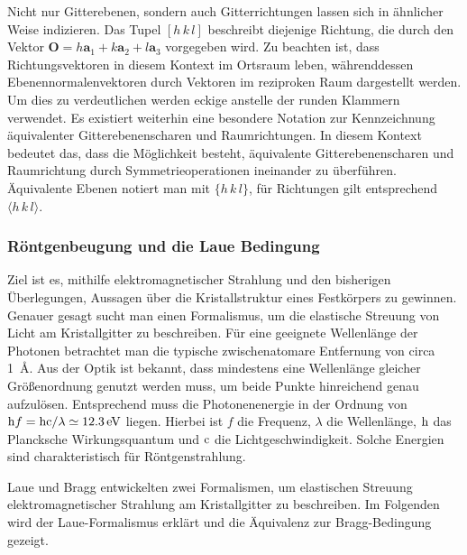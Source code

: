 Nicht nur Gitterebenen, sondern auch Gitterrichtungen lassen sich in ähnlicher Weise indizieren.
Das Tupel $[h\,k\,l]$ beschreibt diejenige Richtung, die durch den Vektor $\mathbf{O} = h\mathbf{a}_{1}+k\mathbf{a}_{2}+
l\mathbf{a}_{3}$ vorgegeben wird.
Zu beachten ist, dass Richtungsvektoren in diesem Kontext im Ortsraum leben,
währenddessen Ebenennormalenvektoren durch Vektoren im reziproken Raum dargestellt werden.
Um dies zu verdeutlichen werden eckige anstelle der runden Klammern verwendet.
Es existiert weiterhin eine besondere Notation zur Kennzeichnung äquivalenter Gitterebenenscharen und Raumrichtungen.
In diesem Kontext bedeutet das, dass die Möglichkeit besteht, äquivalente Gitterebenenscharen und Raumrichtung durch
Symmetrieoperationen ineinander zu überführen.
Äquivalente Ebenen notiert man mit $\{h \,k\, l \}$, für Richtungen gilt entsprechend $\langle h\, k \, l \rangle$.
\autocite[116]{Ashcroft}

\subsubsection{Röntgenbeugung und die Laue Bedingung}
Ziel ist es, mithilfe elektromagnetischer Strahlung und den bisherigen Überlegungen, Aussagen über die
Kristallstruktur eines Festkörpers zu gewinnen.
Genauer gesagt sucht man einen Formalismus, um die elastische Streuung von Licht am Kristallgitter zu beschreiben.
Für eine geeignete Wellenlänge der Photonen betrachtet man die typische zwischenatomare Entfernung von circa
\qty{1}{\angstrom}.
Aus der Optik ist bekannt, dass mindestens eine Wellenlänge gleicher Größenordnung genutzt werden
muss, um beide Punkte hinreichend genau aufzulösen.
Entsprechend muss die Photonenenergie in der Ordnung von
$\mathrm{h} f =\mathrm{h} \mathrm{c} / \lambda \simeq \qty{12.3}{\electronvolt}$ liegen.
Hierbei ist $f$ die Frequenz, $\lambda$ die Wellenlänge, $\mathrm{h}$ das Plancksche Wirkungsquantum und $\mathrm{c}$ die
Lichtgeschwindigkeit.
Solche Energien sind charakteristisch für Röntgenstrahlung. \autocite[120]{Ashcroft}

Laue und Bragg entwickelten zwei Formalismen, um elastischen Streuung elektromagnetischer Strahlung am Kristallgitter
zu beschreiben.
Im Folgenden wird der Laue-Formalismus erklärt und die Äquivalenz zur Bragg-Bedingung gezeigt.

